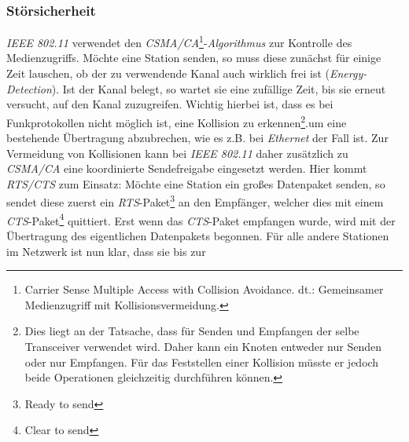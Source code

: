         \subsubsection{Störsicherheit}\label{WlanStoersicherheit}

            \emph{IEEE 802.11} verwendet den \emph{CSMA/CA}\footnote{Carrier Sense Multiple Access with 
            Collision Avoidance. dt.: Gemeinsamer Medienzugriff mit Kollisionsvermeidung.}-\emph{Algorithmus}
            zur Kontrolle des Medienzugriffs. Möchte eine Station senden, so muss diese zunächst
            für einige Zeit lauschen, ob der zu verwendende Kanal auch wirklich frei ist
            (\emph{Energy-Detection}).
            Ist der Kanal belegt, so wartet sie eine zufällige Zeit, bis sie erneut versucht,
            auf den Kanal zuzugreifen. Wichtig hierbei ist, dass es bei Funkprotokollen nicht
            möglich ist, eine Kollision zu erkennen\footnote{Dies liegt an der Tatsache, dass 
                für Senden und Empfangen der selbe Transceiver verwendet wird. 
            Daher kann ein Knoten entweder nur Senden oder nur Empfangen. Für das Feststellen einer Kollision müsste er
            jedoch beide Operationen gleichzeitig durchführen können.}.um eine bestehende Übertragung abzubrechen,
            wie es z.B. bei \textsl{Ethernet} der Fall ist. Zur Vermeidung von Kollisionen
            kann bei \emph{IEEE 802.11} daher zusätzlich zu \emph{CSMA/CA} eine koordinierte Sendefreigabe eingesetzt
            werden. Hier kommt \emph{RTS/CTS} zum Einsatz: Möchte eine Station ein großes Datenpaket
            senden, so sendet diese zuerst ein \emph{RTS}-Paket\footnote{Ready to send} an den Empfänger, 
            welcher dies mit einem \emph{CTS}-Paket\footnote{Clear to send} quittiert. Erst wenn das
            \emph{CTS}-Paket empfangen wurde, wird mit der Übertragung des eigentlichen Datenpakets
            begonnen. Für alle andere Stationen im Netzwerk ist nun klar, dass sie bis zur
